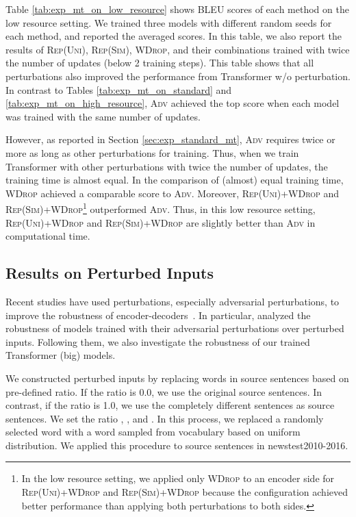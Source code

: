 \documentclass[11pt]{article}
\newcommand{\uniform}{\textsc{Rep(Uni)}}
\newcommand{\similarity}{\textsc{Rep(Sim)}}
\newcommand{\worddrop}{\textsc{WDrop}}
\newcommand{\adv}{\textsc{Adv}}
\begin{document}
Table \ref{tab:exp_mt_on_low_resource} shows BLEU scores of each method on the low resource setting.
We trained three models with different random seeds for each method, and reported the averaged scores.
In this table, we also report the results of \uniform{}, \similarity{}, \worddrop{}, and their combinations trained with twice the number of updates (below 2 training steps).
This table shows that all perturbations also improved the performance from Transformer w/o perturbation.
In contrast to Tables \ref{tab:exp_mt_on_standard} and \ref{tab:exp_mt_on_high_resource}, \adv{} achieved the top score when each model was trained with the same number of updates.


However, as reported in Section \ref{sec:exp_standard_mt}, \adv{} requires twice or more as long as other perturbations for training.
Thus, when we train Transformer with other perturbations with twice the number of updates, the training time is almost equal.
In the comparison of (almost) equal training time, \worddrop{} achieved a comparable score to \adv{}.
Moreover, \uniform{}+\worddrop{} and \similarity{}+\worddrop{}\footnote{In the low resource setting, we applied only \worddrop{} to an encoder side for \uniform{}+\worddrop{} and \similarity{}+\worddrop{} because the configuration achieved better performance than applying both perturbations to both sides.} outperformed \adv{}.
Thus, in this low resource setting, \uniform{}+\worddrop{} and \similarity{}+\worddrop{} are slightly better than \adv{} in computational time.


\subsection{Results on Perturbed Inputs}
\label{sec:exp_on_perturbed_input}

Recent studies have used perturbations, especially adversarial perturbations, to improve the robustness of encoder-decoders~\cite{sato-etal-2019-effective,cheng-etal-2019-robust,pmlr-v97-wang19f}.
In particular,  analyzed the robustness of models trained with their adversarial perturbations over perturbed inputs.
Following them, we also investigate the robustness of our trained Transformer (big) models.


We constructed perturbed inputs by replacing words in source sentences based on pre-defined ratio.
If the ratio is 0.0, we use the original source sentences.
In contrast, if the ratio is 1.0, we use the completely different sentences as source sentences.
We set the ratio , , and .
In this process, we replaced a randomly selected word with a word sampled from vocabulary based on uniform distribution.
We applied this procedure to source sentences in newstest2010-2016.
\end{document}
